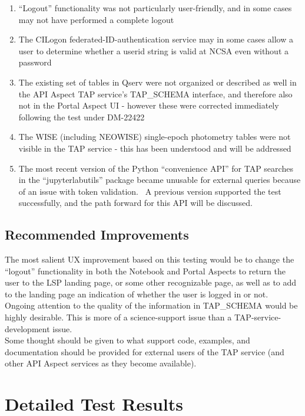 \documentclass[DM,lsstdraft,STR,toc]{lsstdoc}
\providecommand{\tightlist}{
  \setlength{\itemsep}{0pt}\setlength{\parskip}{0pt}}
\begin{document}
\begin{enumerate}
\tightlist
\item
  ``Logout'' functionality was not particularly user-friendly, and in
  some cases may not have performed a complete logout
\item
  The CILogon federated-ID-authentication service may in some cases
  allow a user to determine whether a userid string is valid at NCSA
  even without a password
\item
  The existing set of tables in Qserv were not organized or described as
  well in the API Aspect TAP service's TAP\_SCHEMA interface, and
  therefore also not in the Portal Aspect UI - however these were
  corrected immediately following the test under DM-22422
\item
  The WISE (including NEOWISE) single-epoch photometry tables were not
  visible in the TAP service - this has been understood and will be
  addressed
\item
  The most recent version of the Python ``convenience API'' for TAP
  searches in the ``jupyterlabutils'' package became unusable for
  external queries because of an issue with token validation. ~A
  previous version supported the test successfully, and the path forward
  for this API will be discussed.
\end{enumerate}


\subsection{Recommended Improvements}
\label{sect:recommendations}

The most salient UX improvement based on this testing would be to change
the ``logout'' functionality in both the Notebook and Portal Aspects to
return the user to the LSP landing page, or some other recognizable
page, as well as to add to the landing page an indication of whether the
user is logged in or not.\\[2\baselineskip]Ongoing attention to the
quality of the information in TAP\_SCHEMA would be highly desirable.
This is more of a science-support issue than a TAP-service-development
issue.\\[2\baselineskip]Some thought should be given to what support
code, examples, and documentation should be provided for external users
of the TAP service (and other API Aspect services as they become
available).~


\newpage
\section{Detailed Test Results}
\label{sect:detailedtestresults}
\end{document}
